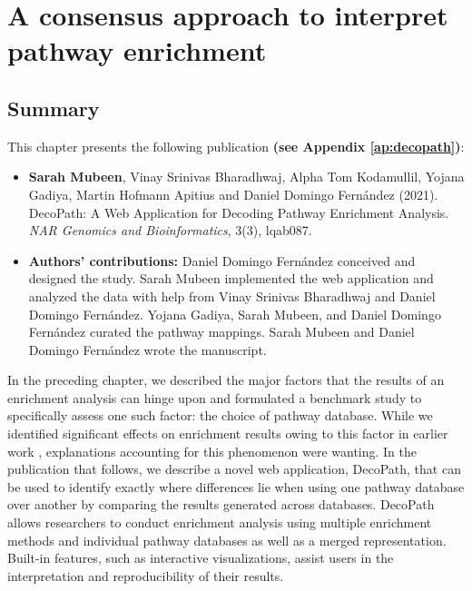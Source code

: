 \chapter{A consensus approach to interpret pathway enrichment}

\label{ch:decopath}

\section*{Summary}

This chapter presents the following publication \textbf{(see Appendix \ref{ap:decopath})}:

\begin{itemize}

\item[] \textbf{Sarah Mubeen}, Vinay Srinivas Bharadhwaj, Alpha Tom Kodamullil, Yojana Gadiya, Martin Hofmann Apitius and Daniel Domingo Fernández (2021). DecoPath: A Web Application for Decoding Pathway Enrichment Analysis.  \textit{NAR Genomics and Bioinformatics}, 3(3), lqab087.

\item[] \textbf{Authors' contributions:} Daniel Domingo Fernández conceived and designed the study. Sarah Mubeen implemented the web application and analyzed the data with help from Vinay Srinivas Bharadhwaj and Daniel Domingo Fernández. Yojana Gadiya, Sarah Mubeen, and Daniel Domingo Fernández curated the pathway mappings. Sarah Mubeen and Daniel Domingo Fernández wrote the manuscript.

\end{itemize}

\noindent
In the preceding chapter, we described the major factors that the results of an enrichment analysis can hinge upon and formulated a benchmark study to specifically assess one such factor: the choice of pathway database. While we identified significant effects on enrichment results owing to this factor in earlier work \parencite{mubeen2019}, explanations accounting for this phenomenon were wanting. In the publication that follows, we describe a novel web application, DecoPath, that can be used to identify exactly where differences lie when using one pathway database over another by comparing the results generated across databases. DecoPath allows researchers to conduct enrichment analysis using multiple enrichment methods and individual pathway databases as well as a merged representation. Built-in features, such as interactive visualizations, assist users in the interpretation and reproducibility of their results. 


